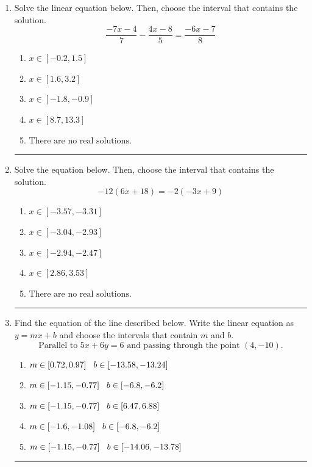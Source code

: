 \documentclass[14pt]{extbook}
\newcommand{\litem}[1]{\item#1\hspace*{-1cm}\rule{\textwidth}{0.4pt}}
\begin{document}
\begin{enumerate}
{\begin{enumerate}[label=\Alph*.]
\end{enumerate} }
\litem{
Solve the linear equation below. Then, choose the interval that contains the solution.\[ \frac{-7x -4}{7} - \frac{4x -8}{5} = \frac{-6x -7}{8} \]\begin{enumerate}[label=\Alph*.]
\item \( x \in [-0.2, 1.5] \)
\item \( x \in [1.6, 3.2] \)
\item \( x \in [-1.8, -0.9] \)
\item \( x \in [8.7, 13.3] \)
\item \( \text{There are no real solutions.} \)

\end{enumerate} }
\litem{
Solve the equation below. Then, choose the interval that contains the solution.\[ -12(6x + 18) = -2(-3x + 9) \]\begin{enumerate}[label=\Alph*.]
\item \( x \in [-3.57, -3.31] \)
\item \( x \in [-3.04, -2.93] \)
\item \( x \in [-2.94, -2.47] \)
\item \( x \in [2.86, 3.53] \)
\item \( \text{There are no real solutions.} \)

\end{enumerate} }
\litem{
Find the equation of the line described below. Write the linear equation as $ y=mx+b $ and choose the intervals that contain $m$ and $b$.\[ \text{Parallel to } 5 x + 6 y = 6 \text{ and passing through the point } (4, -10). \]\begin{enumerate}[label=\Alph*.]
\item \( m \in [0.72, 0.97] \hspace*{3mm} b \in [-13.58, -13.24] \)
\item \( m \in [-1.15, -0.77] \hspace*{3mm} b \in [-6.8, -6.2] \)
\item \( m \in [-1.15, -0.77] \hspace*{3mm} b \in [6.47, 6.88] \)
\item \( m \in [-1.6, -1.08] \hspace*{3mm} b \in [-6.8, -6.2] \)
\item \( m \in [-1.15, -0.77] \hspace*{3mm} b \in [-14.06, -13.78] \)


\end{enumerate}}
\end{enumerate}
\end{document}
